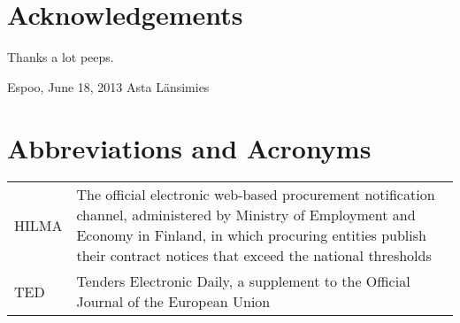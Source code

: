 \documentclass[12pt,a4paper,oneside,pdftex]{report}
\newcommand{\DATE}{June 18, 2013}
\newcommand{\AUTHOR}{Asta Länsimies}
\begin{document}
\chapter*{Acknowledgements}

Thanks a lot peeps.
\vskip 10mm

\noindent Espoo, \DATE
\vskip 5mm
\noindent\AUTHOR

\cleardoublepage
% 

\chapter*{Abbreviations and Acronyms}


\noindent
\begin{longtable}{@{}p{}p{}@{}}
HILMA & The official electronic web-based procurement notification channel, administered by Ministry of Employment and Economy in Finland, in which procuring entities publish their contract notices that exceed the national 
thresholds \\
TED &  Tenders Electronic Daily, a supplement to the Official Journal of the European Union \\


\end{longtable}


\cleardoublepage
\tableofcontents

\end{document}
